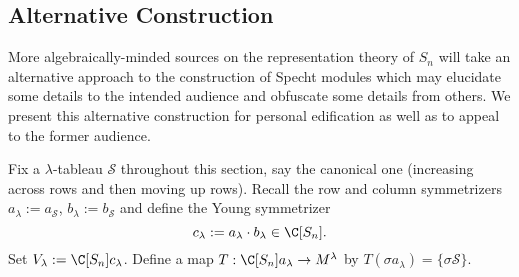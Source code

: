\documentclass[../main.tex]{subfiles}
\begin{document}
\subsection{Alternative Construction}\label{sec:altconst}

More algebraically-minded sources on the representation theory of $ S_{n} $ will take an alternative approach to the construction of Specht modules which may elucidate some details to the intended audience and obfuscate some details from others. We present this alternative construction for personal edification as well as to appeal to the former audience.

Fix a $ \lambda $-tableau $ \mathcal{S} $ throughout this section, say the canonical one (increasing across rows and then moving up rows).
Recall the row and column symmetrizers $ a_{\lambda}:=a_{\mathcal{S}} $, $ b_{\lambda}:=b_{\mathcal{S}} $ and define the Young symmetrizer 
\[
  c_{\lambda} := a_{\lambda}\cdot b_{\lambda}\in \C[S_{n}].
\]
Set $ V_{\lambda} := \C[S_{n}]c_{\lambda} $. Define a map $ T:\C[S_{n}]a_{\lambda} \to M^{\lambda} $ by $ T(\sigma a_{\lambda})= \{\sigma \mathcal{S}\} $. 
%
%
%
%
%
\end{document}
